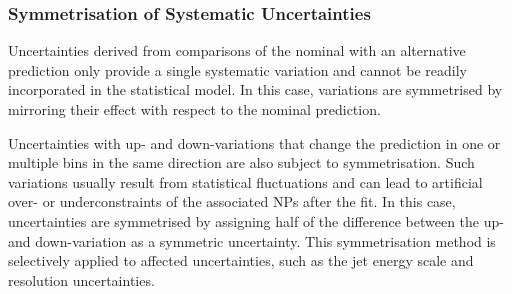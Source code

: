 


\subsubsection{Symmetrisation of Systematic Uncertainties}

Uncertainties derived from comparisons of the nominal with an alternative
prediction only provide a single systematic variation and cannot be readily
incorporated in the statistical model. In this case, variations are symmetrised
by mirroring their effect with respect to the nominal prediction.

Uncertainties with up- and down-variations that change the prediction in one or
multiple bins in the same direction are also subject to symmetrisation. Such
variations usually result from statistical fluctuations and can lead to
artificial over- or underconstraints of the associated NPs after the fit.
In this case, uncertainties are symmetrised by assigning half of the difference
between the up- and down-variation as a symmetric uncertainty. This
symmetrisation method is selectively applied to affected uncertainties, such as
the jet energy scale and resolution uncertainties.




